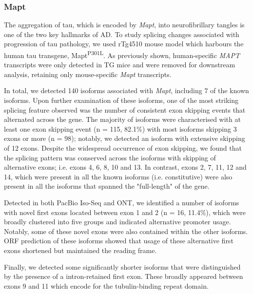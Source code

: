 \newpage
\subsubsection{Mapt}
The aggregation of tau, which is encoded by \textit{Mapt}, into neurofibrillary tangles is one of the two key hallmarks of AD. To study splicing changes associated with progression of tau pathology, we used rTg4510 mouse model which harbours the human tau transgene, Mapt\textsuperscript{P301L}. As previously shown, human-specific \textit{MAPT} transcripts were only detected in TG mice and were removed for downstream analysis, retaining only mouse-specific \textit{Mapt} transcripts. 

In total, we detected 140 isoforms associated with \textit{Mapt}, including 7 of the known isoforms. Upon further examination of these isoforms, one of the most striking splicing feature observed was the number of consistent exon skipping events that alternated across the gene. The majority of isoforms were characterised with at least one exon skipping event (n = 115, 82.1\%) with most isoforms skipping 3 exons or more (n = 98); notably, we detected an isoform with extensive skipping of 12 exons. Despite the widespread occurrence of exon skipping, we found that the splicing pattern was conserved across the isoforms with skipping of alternative exons; i.e. exons 4, 6, 8, 10 and 13. In contrast, exons 2, 7, 11, 12 and 14, which were present in all the known isoforms (i.e. constitutive) were also present in all the isoforms that spanned the "full-length" of the gene. 

Detected in both PacBio Iso-Seq and ONT, we identified a number of isoforms with novel first exons located between exon 1 and 2 (n = 16, 11.4\%), which were broadly clustered into five groups and indicated alternative promoter usage. Notably, some of these novel exons were also contained within the other isoforms. ORF prediction of these isoforms showed that usage of these alternative first exons shortened but maintained the reading frame. 

Finally, we detected some significantly shorter isoforms that were distinguished by the presence of a intron-retained first exon. These broadly appeared between exons 9 and 11 which encode for the tubulin-binding repeat domain. 


